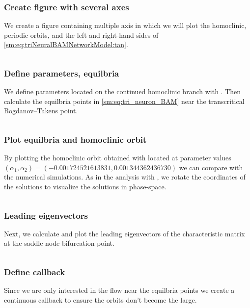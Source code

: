 \subsubsection{Create figure with several axes}
We create a figure containing multiple axis in which we will plot 
the homoclinic, periodic orbits, and the left and right-hand sides
of \cref{sm:eq:triNeuralBAMNetworkModel:tan}.
\inputminted[firstline=79, lastline=89]{julia}{\pathToJuliaFiles/triNeuralBAMNetworkModel_simulation_article.jl}

\subsubsection{Define parameters, equilbria}
We define parameters located on the continued homoclinic branch with
\DDEBIFTOOL. Then calculate the equilbria points in \cref{sm:eq:tri_neuron_BAM}
near the transcritical Bogdanov--Takens point.
\inputminted[firstline=91, lastline=98]{julia}{\pathToJuliaFiles/triNeuralBAMNetworkModel_simulation_article.jl}

\subsubsection{Plot equilbria and homoclinic orbit}
By plotting the homoclinic orbit obtained with \DDEBIFTOOL located at parameter
values $(\alpha_1, \alpha_2) = (-0.001724521613831, 0.001344362436730)$ we can
compare with the numerical simulations. As in the analysis with \DDEBIFTOOL, we
rotate the coordinates of the solutions to visualize the solutions in
phase-space.
\inputminted[firstline=100, lastline=110]{julia}{\pathToJuliaFiles/triNeuralBAMNetworkModel_simulation_article.jl}

\subsubsection{Leading eigenvectors}
Next, we calculate and plot the leading eigenvectors of the characteristic matrix at the saddle-node bifurcation point.
\inputminted[firstline=112, lastline=135]{julia}{\pathToJuliaFiles/triNeuralBAMNetworkModel_simulation_article.jl}

\subsubsection{Define callback}
Since we are only interested in the flow near the equilbria points we create a
continuous callback to ensure the orbits don't become the large.
\inputminted[firstline=137, lastline=140]{julia}{\pathToJuliaFiles/triNeuralBAMNetworkModel_simulation_article.jl}

